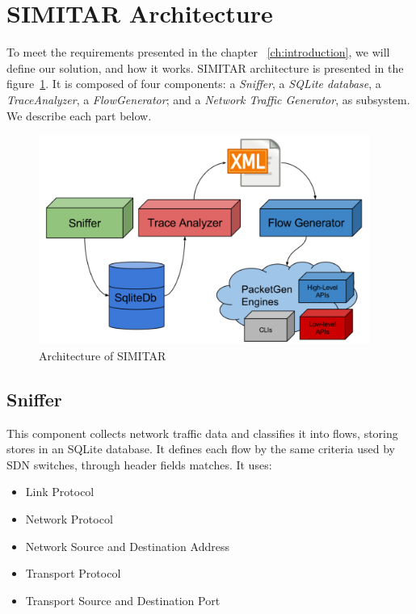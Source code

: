 \section{SIMITAR Architecture}


To meet the requirements presented in the chapter ~\ref{ch:introduction}, we will define our solution, and how it works. SIMITAR architecture is presented in the figure~\ref{fig:architecture}. It is composed of four components: a \textit{Sniffer}, a \textit{SQLite database}, a \textit{TraceAnalyzer}, a \textit{FlowGenerator};  and a \textit{Network Traffic Generator}, as subsystem. We describe each part below.

\begin{figure}[ht!]
        \centering
        \includegraphics[height=2.7in]{figures/ch3/architecture-diagram}
        \caption{Architecture of SIMITAR}
    \label{fig:architecture}
\end{figure}


\subsection{Sniffer}



This component collects network traffic data and classifies it into flows, storing stores in an SQLite database. It defines each flow by the same criteria used by SDN switches\cite{sdn-survey},  through header fields matches. It uses:

\begin{itemize}
\item Link Protocol
\item Network Protocol
\item Network Source and Destination Address
\item Transport Protocol
\item Transport Source and Destination Port
\end{itemize}

